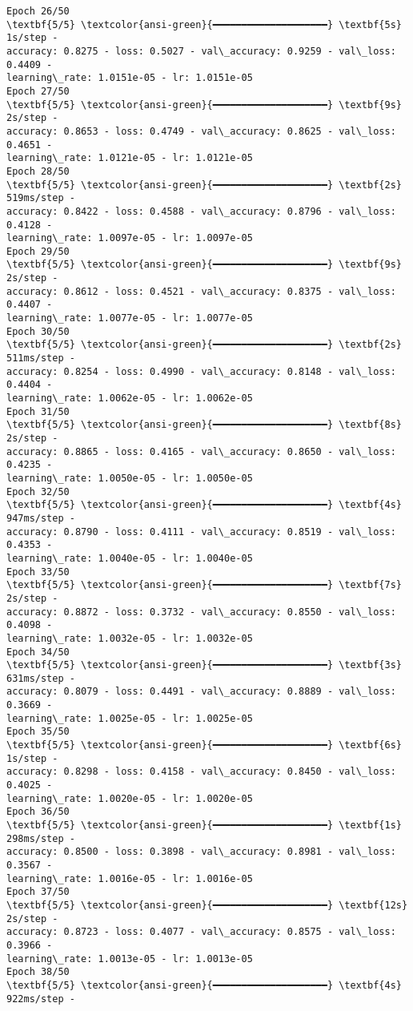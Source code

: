 \documentclass[11pt]{article}
\begin{document}
\begin{Verbatim}[commandchars=\\\{\}]
Epoch 26/50
\textbf{5/5} \textcolor{ansi-green}{━━━━━━━━━━━━━━━━━━━━} \textbf{5s} 1s/step -
accuracy: 0.8275 - loss: 0.5027 - val\_accuracy: 0.9259 - val\_loss: 0.4409 -
learning\_rate: 1.0151e-05 - lr: 1.0151e-05
Epoch 27/50
\textbf{5/5} \textcolor{ansi-green}{━━━━━━━━━━━━━━━━━━━━} \textbf{9s} 2s/step -
accuracy: 0.8653 - loss: 0.4749 - val\_accuracy: 0.8625 - val\_loss: 0.4651 -
learning\_rate: 1.0121e-05 - lr: 1.0121e-05
Epoch 28/50
\textbf{5/5} \textcolor{ansi-green}{━━━━━━━━━━━━━━━━━━━━} \textbf{2s} 519ms/step -
accuracy: 0.8422 - loss: 0.4588 - val\_accuracy: 0.8796 - val\_loss: 0.4128 -
learning\_rate: 1.0097e-05 - lr: 1.0097e-05
Epoch 29/50
\textbf{5/5} \textcolor{ansi-green}{━━━━━━━━━━━━━━━━━━━━} \textbf{9s} 2s/step -
accuracy: 0.8612 - loss: 0.4521 - val\_accuracy: 0.8375 - val\_loss: 0.4407 -
learning\_rate: 1.0077e-05 - lr: 1.0077e-05
Epoch 30/50
\textbf{5/5} \textcolor{ansi-green}{━━━━━━━━━━━━━━━━━━━━} \textbf{2s} 511ms/step -
accuracy: 0.8254 - loss: 0.4990 - val\_accuracy: 0.8148 - val\_loss: 0.4404 -
learning\_rate: 1.0062e-05 - lr: 1.0062e-05
Epoch 31/50
\textbf{5/5} \textcolor{ansi-green}{━━━━━━━━━━━━━━━━━━━━} \textbf{8s} 2s/step -
accuracy: 0.8865 - loss: 0.4165 - val\_accuracy: 0.8650 - val\_loss: 0.4235 -
learning\_rate: 1.0050e-05 - lr: 1.0050e-05
Epoch 32/50
\textbf{5/5} \textcolor{ansi-green}{━━━━━━━━━━━━━━━━━━━━} \textbf{4s} 947ms/step -
accuracy: 0.8790 - loss: 0.4111 - val\_accuracy: 0.8519 - val\_loss: 0.4353 -
learning\_rate: 1.0040e-05 - lr: 1.0040e-05
Epoch 33/50
\textbf{5/5} \textcolor{ansi-green}{━━━━━━━━━━━━━━━━━━━━} \textbf{7s} 2s/step -
accuracy: 0.8872 - loss: 0.3732 - val\_accuracy: 0.8550 - val\_loss: 0.4098 -
learning\_rate: 1.0032e-05 - lr: 1.0032e-05
Epoch 34/50
\textbf{5/5} \textcolor{ansi-green}{━━━━━━━━━━━━━━━━━━━━} \textbf{3s} 631ms/step -
accuracy: 0.8079 - loss: 0.4491 - val\_accuracy: 0.8889 - val\_loss: 0.3669 -
learning\_rate: 1.0025e-05 - lr: 1.0025e-05
Epoch 35/50
\textbf{5/5} \textcolor{ansi-green}{━━━━━━━━━━━━━━━━━━━━} \textbf{6s} 1s/step -
accuracy: 0.8298 - loss: 0.4158 - val\_accuracy: 0.8450 - val\_loss: 0.4025 -
learning\_rate: 1.0020e-05 - lr: 1.0020e-05
Epoch 36/50
\textbf{5/5} \textcolor{ansi-green}{━━━━━━━━━━━━━━━━━━━━} \textbf{1s} 298ms/step -
accuracy: 0.8500 - loss: 0.3898 - val\_accuracy: 0.8981 - val\_loss: 0.3567 -
learning\_rate: 1.0016e-05 - lr: 1.0016e-05
Epoch 37/50
\textbf{5/5} \textcolor{ansi-green}{━━━━━━━━━━━━━━━━━━━━} \textbf{12s} 2s/step -
accuracy: 0.8723 - loss: 0.4077 - val\_accuracy: 0.8575 - val\_loss: 0.3966 -
learning\_rate: 1.0013e-05 - lr: 1.0013e-05
Epoch 38/50
\textbf{5/5} \textcolor{ansi-green}{━━━━━━━━━━━━━━━━━━━━} \textbf{4s} 922ms/step -

\end{Verbatim}
\end{document}
